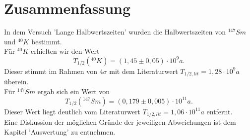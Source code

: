 \clearpage
\section{Zusammenfassung}
In dem Versuch 'Lange Halbwertszeiten' wurden die Halbwertszeiten von $^{147}Sm$ und $^{40}K$ bestimmt. \\
Für $^{40}K$ erhielten wir den Wert \[T_{1/2}(^{40}K)=(1,45\pm0,05)\cdot10^{9}a.\] 
Dieser stimmt im Rahmen von $4\sigma$ mit dem Literaturwert $T_{1/2,lit}=1,28\cdot10^{9}a$ überein.\\
Für $^{147}Sm$ ergab sich ein Wert von 
\[T_{1/2}(^{147}Sm)=(0,179\pm0,005)\cdot10^{11}a.\] 
Dieser Wert liegt deutlich vom Literaturwert $T_{1/2,lit}=1,06\cdot10^{11}a$ entfernt.\\
Eine Diskussion der möglichen Gründe der jeweiligen Abweichungen ist dem Kapitel 'Auswertung' zu entnehmen.